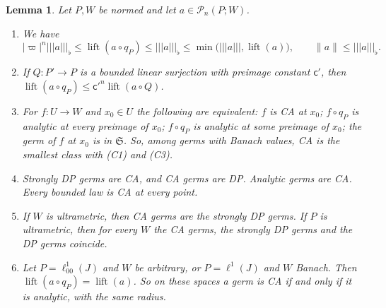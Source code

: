 \documentclass[11pt]{amsart}
\newtheorem{lemma}[theorem]{Lemma}
\theoremstyle{definition}
\theoremstyle{remark}
\numberwithin{equation}{section}
\newcommand{\abs}[1]{\lvert #1\rvert}
\newcommand{\norm}[1]{\lVert #1\rVert}
\theoremstyle{plain}
\theoremstyle{definition}
\theoremstyle{plain}
\newcommand{\cP}{\mathcal P}
\begin{document}
\begin{lemma}\label{dp:lem:cover-flat}
Let $P,W$ be normed and let $a\in\cP_n(P;W)$.
\begin{enumerate}
\item We have
\[
 \abs\varpi^n\lvert\!\lvert\!\lvert a\rvert\!\rvert\!\rvert_\flat\le\operatorname{lift}(a\circ q_P)\le\lvert\!\lvert\!\lvert a\rvert\!\rvert\!\rvert_\flat\le\min\bigl(\lvert\!\lvert\!\lvert a\rvert\!\rvert\!\rvert,\operatorname{lift}(a)\bigr),\qquad\norm a\le\lvert\!\lvert\!\lvert a\rvert\!\rvert\!\rvert_\flat.
\]
\item If $Q\colon P'\to P$ is a bounded linear surjection with preimage constant $\mathsf c'$, then $\operatorname{lift}(a\circ q_P)\le\mathsf c'^n\operatorname{lift}(a\circ Q)$.
\item For $f\colon U\to W$ and $x_0\in U$ the following are equivalent: $f$ is CA at $x_0$; $f\circ q_P$ is analytic at every preimage of $x_0$; $f\circ q_P$ is analytic at some preimage of $x_0$; the germ of $f$ at $x_0$ is in $\mathfrak S$. So, among germs with Banach values, CA is the smallest class with \textup{(C1)} and \textup{(C3)}.
\item Strongly DP germs are CA, and CA germs are DP. Analytic germs are CA. Every bounded law is CA at every point.
\item If $W$ is ultrametric, then CA germs are the strongly DP germs. If $P$ is ultrametric, then for every $W$ the CA germs, the strongly DP germs and the DP germs coincide.
\item Let $P=\ell^1_{00}(J)$ and $W$ be arbitrary, or $P=\ell^1(J)$ and $W$ Banach. Then $\operatorname{lift}(a\circ q_P)=\operatorname{lift}(a)$. So on these spaces a germ is CA if and only if it is analytic, with the same radius.
\end{enumerate}
\end{lemma}
\end{document}
